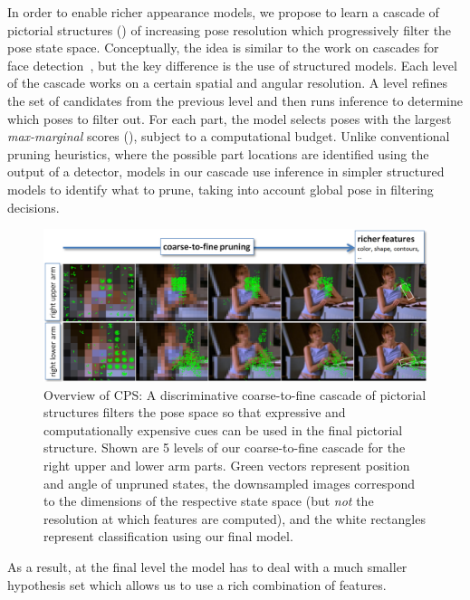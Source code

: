 In order to enable richer appearance models, we propose to learn a cascade of 
pictorial structures (\CPS) of increasing pose resolution which 
progressively filter the pose state space.  Conceptually, the idea is similar 
to the work on cascades for face detection~\cite{geman2001,viola02}, but the 
key difference is the use of structured models. Each level of the cascade works on a certain spatial and angular resolution.  A level refines the set of candidates from the 
previous level and then runs inference to determine which poses to filter out.  
For each part, the model selects poses with the largest {\em max-marginal}
scores (), subject to a computational budget.  Unlike 
conventional pruning heuristics, where the possible part locations are 
identified using the output of a detector, models in our cascade use inference 
in simpler structured models to identify what to prune, taking into account 
global pose in filtering decisions.
\begin{figure}[t]
\begin{center}
\includegraphics[width=1.0\textwidth]{figs/cps-overview.png}
\end{center}
\caption[Overview of Cascaded Pictorial Structures 
(CPS)]{\label{fig:cps-overview} Overview of CPS:  A discriminative 
coarse-to-fine cascade of pictorial structures filters the pose space so that 
expressive and computationally expensive cues can be used in the final 
pictorial structure.  Shown are 5 levels of our coarse-to-fine cascade for the 
right upper and lower arm parts.  Green vectors represent position and angle of 
unpruned states, the downsampled images correspond to the dimensions of the 
respective state space (but {\em not } the resolution at which features are 
computed), and the white rectangles represent classification using our final 
model.}
\end{figure}
As a result, at the final level the \CPS{} model has to deal with a much 
smaller hypothesis set which allows us to use a rich combination of features.  

